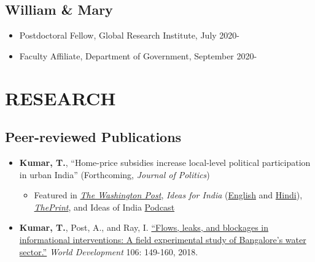 \documentclass[10pt]{article}
\begin{document}
\subsection*{William \& Mary}
	\begin{itemize}[nosep]
		\item[] Postdoctoral Fellow, Global Research Institute, July 2020-
		\item[]Faculty Affiliate, Department of Government, September 2020-
	


	
\end{itemize}	

\vspace{3mm}
\section*{RESEARCH}



\subsection*{Peer-reviewed Publications}
\begin{itemize}
			\item[] \textbf{Kumar, T.}, ``Home-price subsidies increase local-level political participation in urban India'' (Forthcoming, \textit{Journal of Politics})
			\begin{itemize}
			\item Featured in \href{https://www.washingtonpost.com/news/monkey-cage/wp/2019/01/31/heres-what-gavin-newsom-elizabeth-warren-and-microsoft-should-know-if-want-to-end-the-affordable-housing-crisis/?tid=sm_tw_cage}{\textit{The Washington Post}}, \textit{Ideas for India} (\href{https://www.ideasforindia.in/topics/poverty-inequality/household-level-effects-of-affordable-housing-evidence-from-mumbai.html}{English} and \href{https://www.ideasforindia.in/topics/poverty-inequality/household-level-effects-of-affordable-housing-evidence-from-mumbai-hindi.html}{Hindi}), \href{https://theprint.in/opinion/mumbai-residents-win-govt-housing-lottery-and-spend-more-on-kids-education-jobs-study/290485/}{\textit{ThePrint}}, and Ideas of India \href{https://www.discoursemagazine.com/politics/2020/12/24/ideas-of-india-how-does-subsidizing-housing-prices-shape-political-behavior}{Podcast}
			\end{itemize}
		\item[] \textbf{Kumar, T.}, Post, A., and Ray, I. \href{https://www.sciencedirect.com/science/article/pii/S0305750X1830032}{``Flows, leaks, and blockages in informational interventions: A field experimental study of Bangalore's water sector.''} \textit{World Development} 106: 149-160, 2018.
		

\end{itemize}
\end{document}
